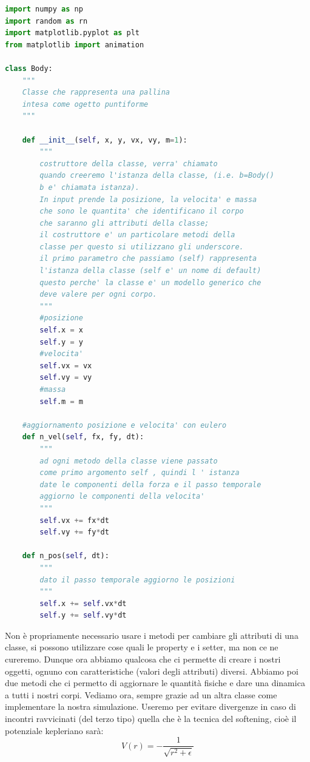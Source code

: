 \documentclass[10pt,a4paper]{article}
\begin{document}
\begin{lstlisting}[language=Python]
import numpy as np
import random as rn
import matplotlib.pyplot as plt
from matplotlib import animation

class Body:
    """
    Classe che rappresenta una pallina
    intesa come ogetto puntiforme
    """

    def __init__(self, x, y, vx, vy, m=1):
        """
        costruttore della classe, verra' chiamato
        quando creeremo l'istanza della classe, (i.e. b=Body()
        b e' chiamata istanza).
        In input prende la posizione, la velocita' e massa
        che sono le quantita' che identificano il corpo
        che saranno gli attributi della classe;
        il costruttore e' un particolare metodi della
        classe per questo si utilizzano gli underscore.
        il primo parametro che passiamo (self) rappresenta
        l'istanza della classe (self e' un nome di default)
        questo perche' la classe e' un modello generico che
        deve valere per ogni corpo.
        """
        #posizione
        self.x = x
        self.y = y
        #velocita'
        self.vx = vx
        self.vy = vy
        #massa
        self.m = m
    
    #aggiornamento posizione e velocita' con eulero
    def n_vel(self, fx, fy, dt):
        """
        ad ogni metodo della classe viene passato
        come primo argomento self , quindi l ' istanza
        date le componenti della forza e il passo temporale
        aggiorno le componenti della velocita'
        """
        self.vx += fx*dt
        self.vy += fy*dt

    def n_pos(self, dt):
        """
        dato il passo temporale aggiorno le posizioni
        """
        self.x += self.vx*dt
        self.y += self.vy*dt

\end{lstlisting}
Non è propriamente necessario usare i metodi per cambiare gli attributi di una classe, si possono utilizzare cose quali le property e i setter, ma non ce ne cureremo. Dunque ora abbiamo qualcosa che ci permette di creare i nostri oggetti, ognuno con caratteristiche (valori degli attributi) diversi. Abbiamo poi due metodi che ci permetto di aggiornare le quantità fisiche e dare una dinamica a tutti i nostri corpi. Vediamo ora, sempre grazie ad un altra classe come implementare la nostra simulazione. Useremo per evitare divergenze in caso di incontri ravvicinati (del terzo tipo) quella che è la tecnica del softening, cioè il potenziale kepleriano sarà:
\begin{equation}
V(r) = - \frac{1}{\sqrt{r^2 + \epsilon}}
\end{equation}
\end{document}
